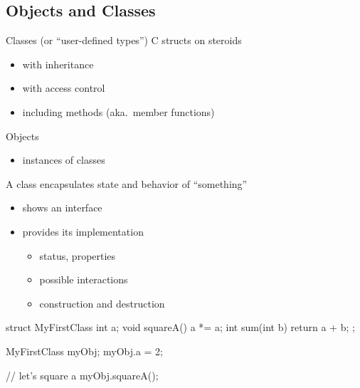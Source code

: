 \subsection[OO]{Objects and Classes}

\begin{frame}[fragile]
  \begin{block}{Classes (or ``user-defined types'')}
    C structs on steroids
    \begin{itemize}
    \item with inheritance
    \item with access control
    \item including methods (aka.\ member functions)
    \end{itemize}
  \end{block}
  \begin{block}{Objects}
    \begin{itemize}
    \item instances of classes
    \end{itemize}
  \end{block}
  \begin{block}{A class encapsulates state and behavior of ``something''}
    \begin{itemize}
    \item shows an interface
    \item provides its implementation
      \begin{itemize}
      \item status, properties
      \item possible interactions
      \item construction and destruction
      \end{itemize}
    \end{itemize}
  \end{block}
\end{frame}


\begin{frame}[fragile]
  \begin{multicols}{2}
    \begin{cppcode*}{}
      struct MyFirstClass {
        int a;
        void squareA() {
          a *= a;
        }
        int sum(int b) {
          return a + b;
        }
      };

      MyFirstClass myObj;
      myObj.a = 2;

      // let's square a
      myObj.squareA();
    \end{cppcode*}
    \columnbreak
    \center
    \null \vfill
    \vfill \null
  \end{multicols}
\end{frame}

